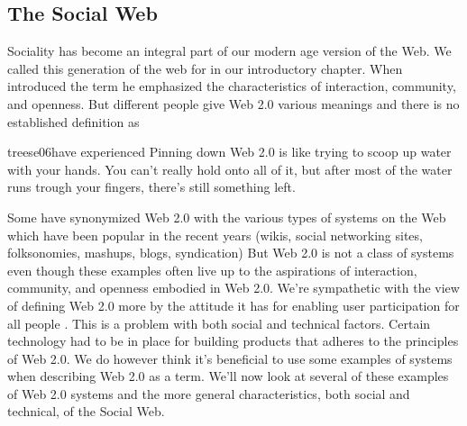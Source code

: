 \subsection{The Social Web}
\label{section:background.sociality.the.social.web}

Sociality has become an integral part of our modern age version of the Web.
We called this generation of the web for %
in our introductory chapter. When \citet{oreilly05} introduced the term he
emphasized the characteristics of interaction, community, and openness.
But different people give Web 2.0 various meanings and there is no
established definition as
\begin{fullquote}[\p{15}]{treese06}{have experienced}
  Pinning down Web 2.0 is like trying to scoop up water with your hands. You
  can't really hold onto all of it, but after most of the water runs trough
  your fingers, there's still something left.
\end{fullquote}

Some have synonymized Web 2.0 with the various types of systems on the
Web which have been popular in the recent years
(wikis, social networking sites, folksonomies, mashups, blogs, syndication)
But Web 2.0 is not a class of systems \citep[]{millard06} even though
these examples often live up to the aspirations of interaction, community,
and openness embodied in Web 2.0. We're sympathetic with the view of defining
Web 2.0 more by the attitude it has for enabling user participation for all
people \citep[]{lin07}. This is a problem with both social and
technical factors. Certain technology had to be in place for building
products that adheres to the principles of Web 2.0. We do however think it's
beneficial to use some examples of systems when describing Web 2.0 as a term.
We'll now look at several of these examples of Web 2.0 systems and
the more general characteristics, both social and technical,
of the Social Web.


